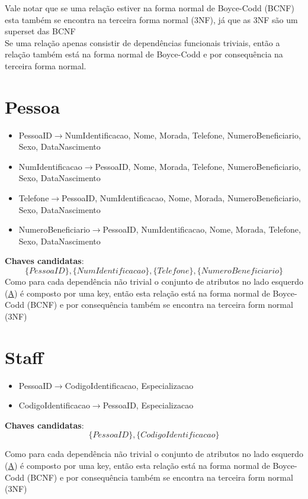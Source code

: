 \documentclass[article, a4paper, 12pt, oneside]{memoir}
\begin{document}
Vale notar que se uma relação estiver na forma normal de Boyce-Codd (BCNF) esta também se encontra na terceira forma normal (3NF), já que as 3NF são um superset das BCNF\\
Se uma relação apenas consistir de dependências funcionais triviais, então a relação também está na forma normal de Boyce-Codd e por consequência na terceira forma normal.

\section*{Pessoa}
\begin{itemize}
	\item PessoaID$\rightarrow$NumIdentificacao, Nome, Morada, Telefone, NumeroBeneficiario, Sexo, DataNascimento
	\item NumIdentificacao$\rightarrow$PessoaID, Nome, Morada, Telefone, NumeroBeneficiario, Sexo, DataNascimento
	\item Telefone$\rightarrow$PessoaID, NumIdentificacao, Nome, Morada, NumeroBeneficiario, Sexo, DataNascimento
	\item NumeroBeneficiario$\rightarrow$PessoaID, NumIdentificacao, Nome, Morada, Telefone, Sexo, DataNascimento
\end{itemize}

\textbf{Chaves candidatas}:\\
\[
\{ PessoaID \}, \{ NumIdentificacao \}, \{ Telefone \}, \{ NumeroBeneficiario \}
\]
Como para cada dependência não trivial o conjunto de atributos no lado esquerdo (\underline{A}) é composto por uma key, então esta relação está na forma normal de Boyce-Codd (BCNF) e por consequência também se encontra na terceira form normal (3NF)

\section*{Staff}
\begin{itemize}
	\item PessoaID$\rightarrow$CodigoIdentificacao, Especializacao
	\item CodigoIdentificacao$\rightarrow$PessoaID, Especializacao
\end{itemize}

\textbf{Chaves candidatas}:\\
\[
\{ PessoaID \}, \{ CodigoIdentificacao \}
\]

Como para cada dependência não trivial o conjunto de atributos no lado esquerdo (\underline{A}) é composto por uma key, então esta relação está na forma normal de Boyce-Codd (BCNF) e por consequência também se encontra na terceira form normal (3NF)
\end{document}
